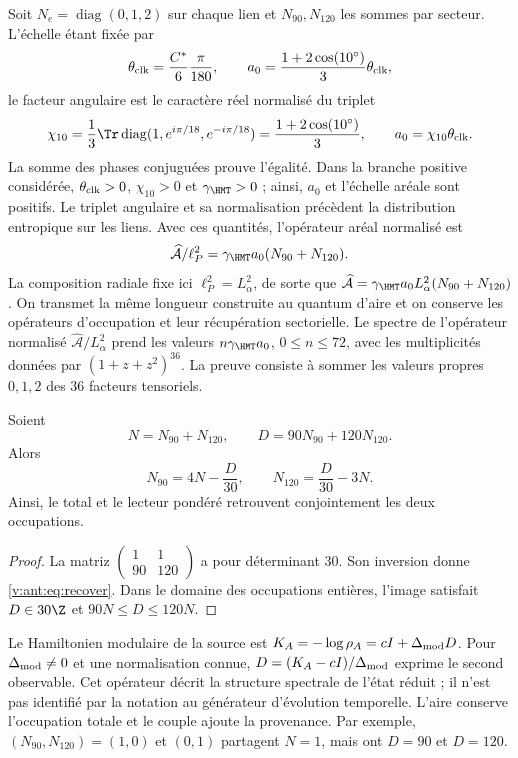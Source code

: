 Soit $N_e=\operatorname{diag}(0,1,2)$ sur chaque lien et
$N_{90},N_{120}$ les sommes par secteur. L'échelle étant fixée par
\[
\theta_{\rm clk}=\frac{C^*}{6}\frac{\pi}{180},\qquad
a_0=\frac{1+2\cos(10^\circ)}3\theta_{\rm clk},
\]
le facteur angulaire est le caractère réel normalisé du triplet
\begin{equation}
 \chi_{10}=\frac13\Tr\operatorname{diag}
       (1,e^{i\pi/18},e^{-i\pi/18})
 =\frac{1+2\cos(10^\circ)}3,
 \qquad a_0=\chi_{10}\theta_{\rm clk}.
 \label{v:ant:eq:ii-area-caracter-triplete}
\end{equation}
La somme des phases conjuguées prouve l'égalité. Dans la branche positive
considérée, \(\theta_{\rm clk}>0\), \(\chi_{10}>0\) et
\(\gamma_{\HMT}>0\) ; ainsi, \(a_0\) et l'échelle aréale sont
positifs. Le triplet angulaire et sa normalisation précèdent la
distribution entropique sur les liens. Avec ces quantités,
l'opérateur aréal normalisé est
\[
\widehat{\mathcal A}/\ell_P^2
=\gamma_{\HMT}a_0(N_{90}+N_{120}).
\]
La composition radiale fixe ici \(\ell_P^2=L_\alpha^2\), de sorte que
\(\widehat{\mathcal A}=\gamma_{\HMT}a_0L_\alpha^2(N_{90}+N_{120})\).
On transmet la même longueur construite au quantum d'aire et on
conserve les opérateurs d'occupation et leur récupération sectorielle.
Le spectre de l'opérateur normalisé \(\widehat{\mathcal A}/L_\alpha^2\)
prend les valeurs $n\gamma_{\HMT}a_0$, $0\le n\le72$,
avec les multiplicités données par $(1+z+z^2)^{36}$.
La preuve consiste à sommer les valeurs propres $0,1,2$ des
36 facteurs tensoriels.

\begin{theorem}
Soient
\[
N=N_{90}+N_{120},\qquad D=90N_{90}+120N_{120}.
\]
Alors
\begin{equation}
N_{90}=4N-\frac D{30},\qquad
N_{120}=\frac D{30}-3N.
\label{v:ant:eq:recover}
\end{equation}
Ainsi, le total et le lecteur pondéré retrouvent conjointement
les deux occupations.
\end{theorem}
\begin{proof}
La matriz $\left(\begin{smallmatrix}1&1\\90&120\end{smallmatrix}\right)$
a pour déterminant $30$. Son inversion donne \eqref{v:ant:eq:recover}.
Dans le domaine des occupations entières, l'image satisfait
$D\in30\Z$ et $90N\le D\le120N$.
\end{proof}

Le Hamiltonien modulaire de la source est
$K_A=-\log\rho_A=cI+\Delta_{\rm mod}D$.
Pour $\Delta_{\rm mod}\ne0$ et une normalisation connue,
$D=(K_A-cI)/\Delta_{\rm mod}$ exprime le second observable.
Cet opérateur décrit la structure spectrale de l’état réduit ;
il n’est pas identifié par la notation au générateur d’évolution temporelle.
L’aire conserve l’occupation totale et le couple ajoute la provenance.
Par exemple, $(N_{90},N_{120})=(1,0)$ et $(0,1)$ partagent $N=1$,
mais ont $D=90$ et $D=120$.

